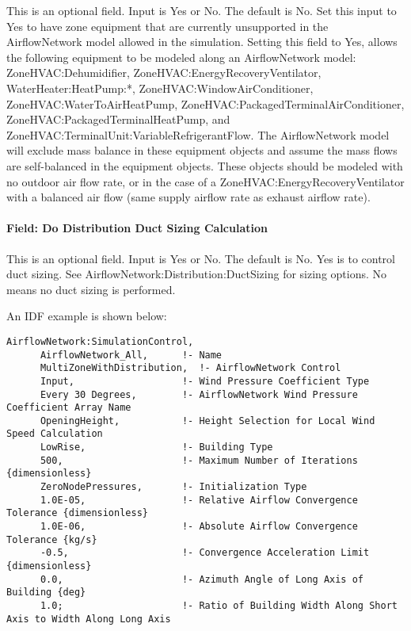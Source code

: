 This is an optional field. Input is Yes or No. The default is No. Set this input to Yes to have zone equipment that are currently unsupported in the AirflowNetwork model allowed in the simulation. Setting this field to Yes, allows the following equipment to be modeled along an AirflowNetwork model: ZoneHVAC:Dehumidifier, ZoneHVAC:EnergyRecoveryVentilator, WaterHeater:HeatPump:*, ZoneHVAC:WindowAirConditioner, ZoneHVAC:WaterToAirHeatPump, ZoneHVAC:PackagedTerminalAirConditioner, ZoneHVAC:PackagedTerminalHeatPump, and ZoneHVAC:TerminalUnit:VariableRefrigerantFlow. The AirflowNetwork model will exclude mass balance in these equipment objects and assume the mass flows are self-balanced in the equipment objects. These objects should be modeled with no outdoor air flow rate, or in the case of a ZoneHVAC:EnergyRecoveryVentilator with a balanced air flow (same supply airflow rate as exhaust airflow rate).

\paragraph{Field: Do Distribution Duct Sizing Calculation}\label{do-distribution-duct-sizing-calculation}

This is an optional field. Input is Yes or No. The default is No. Yes is to control duct sizing. See AirflowNetwork:Distribution:DuctSizing for sizing options. No means no duct sizing is performed.


An IDF example is shown below:

\begin{lstlisting}
AirflowNetwork:SimulationControl,
      AirflowNetwork_All,      !- Name
      MultiZoneWithDistribution,  !- AirflowNetwork Control
      Input,                   !- Wind Pressure Coefficient Type
      Every 30 Degrees,        !- AirflowNetwork Wind Pressure Coefficient Array Name
      OpeningHeight,           !- Height Selection for Local Wind Speed Calculation
      LowRise,                 !- Building Type
      500,                     !- Maximum Number of Iterations {dimensionless}
      ZeroNodePressures,       !- Initialization Type
      1.0E-05,                 !- Relative Airflow Convergence Tolerance {dimensionless}
      1.0E-06,                 !- Absolute Airflow Convergence Tolerance {kg/s}
      -0.5,                    !- Convergence Acceleration Limit {dimensionless}
      0.0,                     !- Azimuth Angle of Long Axis of Building {deg}
      1.0;                     !- Ratio of Building Width Along Short Axis to Width Along Long Axis
\end{lstlisting}

